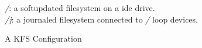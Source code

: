 \begin{figure}[htb]
  \centering
  \caption{A KFS Configuration}{\textit{/}: a softupdated
    filesystem on a ide drive.\\\textit{/j}: a journaled filesystem
    connected to \textit{/} loop devices.}
  \label{fig:kfs-graph}
\end{figure}